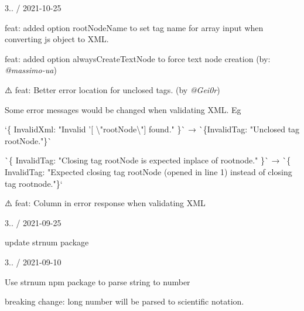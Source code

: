 3.. / 2021-\/10-\/25
\begin{DoxyItemize}
\item feat\+: added option {\ttfamily root\+Node\+Name} to set tag name for array input when converting js object to XML.
\item feat\+: added option {\ttfamily always\+Create\+Text\+Node} to force text node creation (by\+: {\itshape @massimo-\/ua})
\item ⚠️ feat\+: Better error location for unclosed tags. (by {\itshape @\+Gei0r})
\begin{DoxyItemize}
\item Some error messages would be changed when validating XML. Eg
\begin{DoxyItemize}
\item `\{ Invalid\+Xml\+: "{}\+Invalid '\mbox{[}    \textbackslash{}"{}root\+Node\textbackslash{}"{}\mbox{]}\textquotesingle{} found."{} \}\`{} → \`{}\{Invalid\+Tag\+: "{}\+Unclosed tag \textquotesingle{}root\+Node\textquotesingle{}."{}\}\`{}
\item \`{}\{ Invalid\+Tag\+: "{}\+Closing tag \textquotesingle{}root\+Node\textquotesingle{} is expected inplace of \textquotesingle{}rootnode\textquotesingle{}."{} \}\`{} → \`{}\{ Invalid\+Tag\+: "{}\+Expected closing tag \textquotesingle{}root\+Node\textquotesingle{} (opened in line 1) instead of closing tag \textquotesingle{}rootnode\textquotesingle{}."{}\}`
\end{DoxyItemize}
\end{DoxyItemize}
\item ⚠️ feat\+: Column in error response when validating XML 
\begin{DoxyCode}{0}
\DoxyCodeLine{\{}
\DoxyCodeLine{\}}

\end{DoxyCode}

\end{DoxyItemize}

3.. / 2021-\/09-\/25
\begin{DoxyItemize}
\item update strnum package
\end{DoxyItemize}

3.. / 2021-\/09-\/10
\begin{DoxyItemize}
\item Use strnum npm package to parse string to number
\begin{DoxyItemize}
\item breaking change\+: long number will be parsed to scientific notation.
\end{DoxyItemize}
\end{DoxyItemize}

